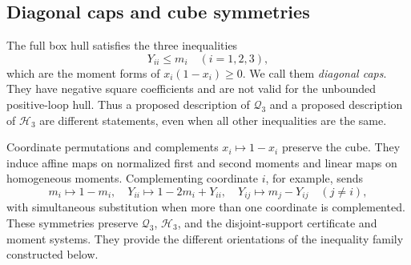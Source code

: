 \subsection{Diagonal caps and cube symmetries}\label{set:caps}
The full box hull satisfies the three inequalities
\begin{equation}\label{eq:set:caps}
 Y_{ii}\le m_i\quad(i=1,2,3),
\end{equation}
which are the moment forms of $x_i(1-x_i)\ge0$. We call them
\emph{diagonal caps}. They have negative square coefficients and are not
valid for the unbounded positive-loop hull. Thus a proposed description of
$\mathcal Q_3$ and a proposed description of $\mathcal H_3$ are different
statements, even when all other inequalities are the same.

\label{set:symmetry}
Coordinate permutations and complements $x_i\mapsto1-x_i$ preserve the
cube. They induce affine maps on normalized first and second moments and
linear maps on homogeneous moments. Complementing coordinate $i$, for
example, sends
\[
 m_i\mapsto1-m_i,\quad
 Y_{ii}\mapsto1-2m_i+Y_{ii},\quad
 Y_{ij}\mapsto m_j-Y_{ij}\quad(j\ne i),
\]
with simultaneous substitution when more than one coordinate is
complemented. These symmetries preserve $\mathcal Q_3$, $\mathcal H_3$,
and the disjoint-support certificate and moment systems. They provide the
different orientations of the inequality family constructed below.
